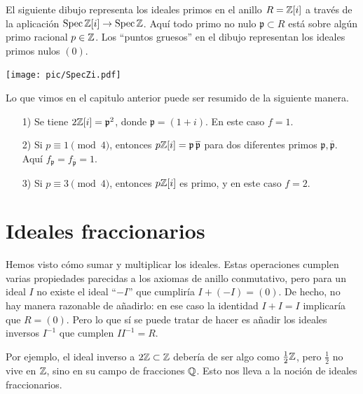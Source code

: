 \begin{ejemplo}
  El siguiente dibujo representa los ideales primos en el anillo $R = \mathbb{Z} [i]$ a
  través de la aplicación $\operatorname{Spec} \mathbb{Z} [i] \to \operatorname{Spec} \mathbb{Z}$. Aquí todo primo no nulo
  $\mathfrak{p} \subset R$ está sobre algún primo racional $p \in \mathbb{Z}$.  Los
  ``puntos gruesos'' en el dibujo representan los ideales primos nulos $(0)$.

  \begin{center}
    \texttt{[image: pic/SpecZi.pdf]}
  \end{center}

  Lo que vimos en el capitulo anterior puede ser resumido de la siguiente
  manera.
  \begin{enumerate}
  \item[1)] Se tiene $2\mathbb{Z} [i] = \mathfrak{p}^2$, donde $\mathfrak{p} = (1+i)$.
    En este caso $f = 1$.

  \item[2)] Si $p \equiv 1 \pmod{4}$, entonces
    $p\mathbb{Z} [i] = \mathfrak{p} \,\overline{\mathfrak{p}}$
    para dos diferentes primos $\mathfrak{p},\overline{\mathfrak{p}}$.
    Aquí $f_\mathfrak{p} = f_{\overline{\mathfrak{p}}} = 1$.

  \item[3)] Si $p \equiv 3 \pmod{4}$, entonces $p\mathbb{Z} [i]$ es primo, y en este
    caso $f = 2$. \qedhere
  \end{enumerate}
\end{ejemplo}


\section{Ideales fraccionarios}

Hemos visto cómo sumar y multiplicar los ideales. Estas operaciones cumplen
varias propiedades parecidas a los axiomas de anillo conmutativo, pero para un
ideal $I$ no existe el ideal ``$-I$'' que cumpliría $I + (-I) = (0)$. De hecho,
no hay manera razonable de añadirlo: en ese caso la identidad $I + I = I$
implicaría que $R = (0)$. Pero lo que sí se puede tratar de hacer es añadir los
ideales inversos $I^{-1}$ que cumplen $I I^{-1} = R$.

Por ejemplo, el ideal inverso a $2\mathbb{Z} \subset \mathbb{Z}$ debería de ser algo como
$\frac{1}{2}\mathbb{Z}$, pero $\frac{1}{2}$ no vive en $\mathbb{Z}$, sino en su
campo de fracciones $\mathbb{Q}$. Esto nos lleva a la noción de ideales fraccionarios.

